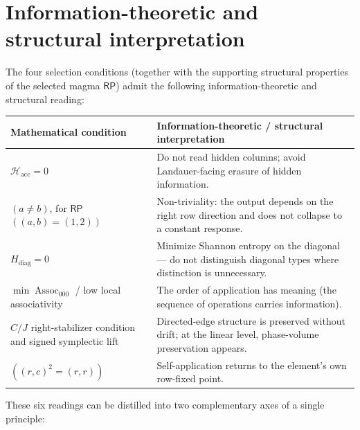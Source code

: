 \documentclass[11pt]{article}
\theoremstyle{definition}
\newcommand{\RP}{\mathsf{RP}}
\begin{document}
\section{Information-theoretic and structural interpretation}
\label{structural-reading-selection-conditions}
\label{appendix-information-theoretic-structural-interpretation}

The four selection conditions (together with the supporting structural properties of the selected magma \(\RP\)) admit the following information-theoretic and structural reading:

\begin{center}
\begin{tabular}{@{}p{} p{}@{}}
\toprule
\textbf{Mathematical condition} & \textbf{Information-theoretic / structural interpretation} \\
\midrule
\(\mathcal{H}_{\mathrm{acc}} = 0\) 
& Do not read hidden columns; avoid Landauer-facing erasure of hidden information. \\[8pt]

\((a \ne b)\), for \(\RP\) \(((a,b)=(1,2))\) 
& Non-triviality: the output depends on the right row direction and does not collapse to a constant response. \\[8pt]

\(H_{\mathrm{diag}} = 0\) 
& Minimize Shannon entropy on the diagonal — do not distinguish diagonal types where distinction is unnecessary. \\[8pt]

\(\min\operatorname{Assoc}_{000}\) / low local associativity 
& The order of application has meaning (the sequence of operations carries information). \\[8pt]

\(C/J\) right-stabilizer condition and signed symplectic lift 
& Directed-edge structure is preserved without drift; at the linear level, phase-volume preservation appears. \\[8pt]

\(((r,c)^2 = (r,r))\) 
& Self-application returns to the element's own row-fixed point. \\
\bottomrule
\end{tabular}
\end{center}

These six readings can be distilled into two complementary axes of a single principle:

\begin{center}
 \\[12pt]
\end{center}
\end{document}
